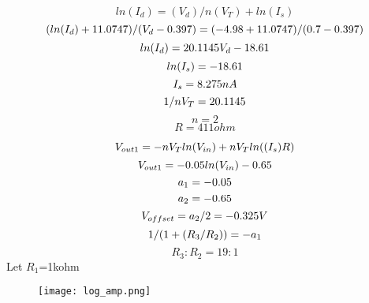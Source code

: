 \documentclass[12pt]{article}
\begin{document}
 \begin{equation}
     ln(I_{d})=(V_{d})/n(V_{T})+ln(I_{s})
     \end{equation} 
\begin{equation}
     (ln(I_{d})+11.0747)/(V_{d}-0.397)=(-4.98+11.0747)/(0.7-0.397)\newline
     \end{equation} 
     \begin{equation}
     ln(I_{d})=20.1145V_{d}-18.61\newline
     \end{equation} 
     \begin{equation}
     ln(I_{s})=-18.61\newline
     \end{equation} 
     \begin{equation}
     I_{s}=8.275nA\newline
     \end{equation} 
\newpage
     \begin{equation}
     1/nV_{T}=20.1145\newline
\end{equation} 
\begin{equation}
n=2
\end{equation} 
\begin{equation}
R=411ohm
 \end{equation}     
 
 \begin{equation}
     V_{out1}=-nV_{T}ln(V_{in})+nV_{T}ln((I_{s})R)\newline
\end{equation} 
\begin{equation}
     V_{out1}=-0.05ln(V_{in})-0.65\newline
\end{equation} 
\begin{equation}
     a_{1}=-0.05\newline
\end{equation}      
 \begin{equation}
     a_{2}=-0.65\newline
\end{equation} 
\begin{equation}
     V_{offset}=a_{2}/2=-0.325V\newline
\end{equation} 
\begin{equation}
1/(1+(R_{3}/R_{2}))=-a_{1}\newline
\end{equation} 
\begin{equation}
R_{3}:R_{2}=19:1
 \end{equation}     
Let \(R_{1}\)=1kohm
\newpage
\begin{figure}

\centering
\texttt{[image: log\_amp.png]}
\end{figure}
\end{document}
